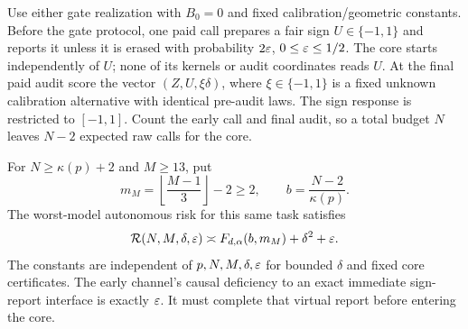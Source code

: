 \begin{theorem}\label{thm:joint}
Use either gate realization with $B_0=0$ and fixed calibration/geometric constants. Before the gate protocol, one paid call prepares a fair sign $U\in\{-1,1\}$ and reports it unless it is erased with probability $2\varepsilon$, $0\le\varepsilon\le1/2$. The core starts independently of $U$; none of its kernels or audit coordinates reads $U$. At the final paid audit score the vector $(Z,U,\xi\delta)$, where $\xi\in\{-1,1\}$ is a fixed unknown calibration alternative with identical pre-audit laws. The sign response is restricted to $[-1,1]$. Count the early call and final audit, so a total budget $N$ leaves $N-2$ expected raw calls for the core.

For $N\ge\kappa(p)+2$ and $M\ge13$, put
\[
 m_M=\left\lfloor\frac{M-1}{3}\right\rfloor-2\ge2,\qquad
 b=\frac{N-2}{\kappa(p)}.
\]
The worst-model autonomous risk for this same task satisfies
\begin{equation}\label{eq:joint-law}
 \mathcal R(N,M,\delta,\varepsilon)
 \asymp F_{d,\alpha}(b,m_M)+\delta^2+\varepsilon.
\end{equation}
The constants are independent of $p,N,M,\delta,\varepsilon$ for bounded $\delta$ and fixed core certificates. The early channel's causal deficiency to an exact immediate sign-report interface is exactly $\varepsilon$. It must complete that virtual report before entering the core.
\end{theorem}
